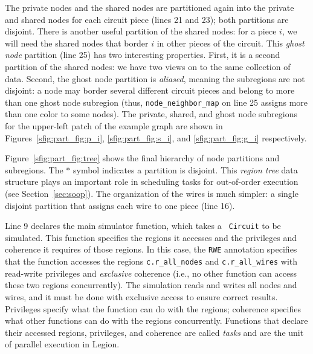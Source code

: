 The private nodes and the shared nodes are partitioned again into the private and shared nodes for each circuit piece (lines 21
and 23);  both partitions are disjoint.  There is another useful partition of the shared nodes:
for a piece $i$, we will need the shared nodes that border $i$ in other pieces of the circuit.
This {\em ghost node} partition (line 25) has two interesting properties.  First, it is a second partition of the shared nodes:
we have two views on to the same collection of data.  Second, the ghost node partition is {\em aliased}, meaning the subregions
are not disjoint: a node may border several different circuit pieces and belong to more than one ghost node subregion (thus, {\tt node\_neighbor\_map} on line 25 assigns more than one color to some nodes).
The private, shared, and ghost node subregions
for the upper-left patch of the example graph are shown in
Figures~\ref{sfig:part_fig:p_i}, \ref{sfig:part_fig:s_i}, and
\ref{sfig:part_fig:g_i} respectively.  

Figure~\ref{sfig:part_fig:tree} shows the final hierarchy of node
partitions and subregions. The $*$ symbol indicates a partition is disjoint. This
{\em region tree} data structure plays an important role in scheduling
tasks for out-of-order execution (see Section~\ref{sec:soop}).
The organization of the wires is much simpler: a single disjoint partition
that assigns each wire to one piece (line 16).

%
%
Line 9 declares the main simulator function, which takes a {\tt
Circuit} to be simulated.  This function specifies the regions it 
accesses and the privileges and coherence it requires of those regions.
In this case, the {\tt RWE} annotation specifies that the function
accesses the regions {\tt c.r\_all\_nodes} and {\tt c.r\_all\_wires}
with read-write privileges and {\em exclusive} coherence (i.e., no other
function can access these two regions concurrently).  The simulation 
reads and writes all nodes and wires, and it must be done
with exclusive access to ensure correct results.  Privileges specify what
the function can do with the regions; coherence specifies what other
functions can do with the regions concurrently.  Functions that
declare their accessed regions, privileges, and coherence are called {\em tasks}
and are the unit of parallel execution in Legion.

